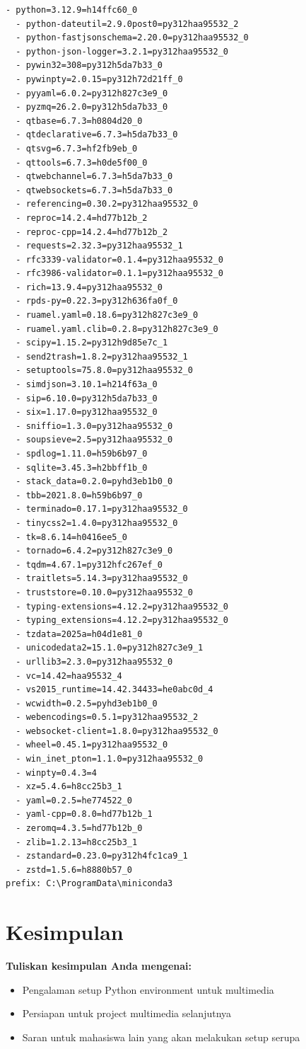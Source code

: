 \documentclass[11pt,a4paper]{article}
\begin{document}
\begin{lstlisting}[caption=Requirements file For Environment Reproduction]
  - python=3.12.9=h14ffc60_0
  - python-dateutil=2.9.0post0=py312haa95532_2
  - python-fastjsonschema=2.20.0=py312haa95532_0
  - python-json-logger=3.2.1=py312haa95532_0
  - pywin32=308=py312h5da7b33_0
  - pywinpty=2.0.15=py312h72d21ff_0
  - pyyaml=6.0.2=py312h827c3e9_0
  - pyzmq=26.2.0=py312h5da7b33_0
  - qtbase=6.7.3=h0804d20_0
  - qtdeclarative=6.7.3=h5da7b33_0
  - qtsvg=6.7.3=hf2fb9eb_0
  - qttools=6.7.3=h0de5f00_0
  - qtwebchannel=6.7.3=h5da7b33_0
  - qtwebsockets=6.7.3=h5da7b33_0
  - referencing=0.30.2=py312haa95532_0
  - reproc=14.2.4=hd77b12b_2
  - reproc-cpp=14.2.4=hd77b12b_2
  - requests=2.32.3=py312haa95532_1
  - rfc3339-validator=0.1.4=py312haa95532_0
  - rfc3986-validator=0.1.1=py312haa95532_0
  - rich=13.9.4=py312haa95532_0
  - rpds-py=0.22.3=py312h636fa0f_0
  - ruamel.yaml=0.18.6=py312h827c3e9_0
  - ruamel.yaml.clib=0.2.8=py312h827c3e9_0
  - scipy=1.15.2=py312h9d85e7c_1
  - send2trash=1.8.2=py312haa95532_1
  - setuptools=75.8.0=py312haa95532_0
  - simdjson=3.10.1=h214f63a_0
  - sip=6.10.0=py312h5da7b33_0
  - six=1.17.0=py312haa95532_0
  - sniffio=1.3.0=py312haa95532_0
  - soupsieve=2.5=py312haa95532_0
  - spdlog=1.11.0=h59b6b97_0
  - sqlite=3.45.3=h2bbff1b_0
  - stack_data=0.2.0=pyhd3eb1b0_0
  - tbb=2021.8.0=h59b6b97_0
  - terminado=0.17.1=py312haa95532_0
  - tinycss2=1.4.0=py312haa95532_0
  - tk=8.6.14=h0416ee5_0
  - tornado=6.4.2=py312h827c3e9_0
  - tqdm=4.67.1=py312hfc267ef_0
  - traitlets=5.14.3=py312haa95532_0
  - truststore=0.10.0=py312haa95532_0
  - typing-extensions=4.12.2=py312haa95532_0
  - typing_extensions=4.12.2=py312haa95532_0
  - tzdata=2025a=h04d1e81_0
  - unicodedata2=15.1.0=py312h827c3e9_1
  - urllib3=2.3.0=py312haa95532_0
  - vc=14.42=haa95532_4
  - vs2015_runtime=14.42.34433=he0abc0d_4
  - wcwidth=0.2.5=pyhd3eb1b0_0
  - webencodings=0.5.1=py312haa95532_2
  - websocket-client=1.8.0=py312haa95532_0
  - wheel=0.45.1=py312haa95532_0
  - win_inet_pton=1.1.0=py312haa95532_0
  - winpty=0.4.3=4
  - xz=5.4.6=h8cc25b3_1
  - yaml=0.2.5=he774522_0
  - yaml-cpp=0.8.0=hd77b12b_1
  - zeromq=4.3.5=hd77b12b_0
  - zlib=1.2.13=h8cc25b3_1
  - zstandard=0.23.0=py312h4fc1ca9_1
  - zstd=1.5.6=h8880b57_0
prefix: C:\ProgramData\miniconda3
\end{lstlisting}

\section{Kesimpulan}
\textbf{Tuliskan kesimpulan Anda mengenai:}
\begin{itemize}
    \item Pengalaman setup Python environment untuk multimedia
    \item Persiapan untuk project multimedia selanjutnya
    \item Saran untuk mahasiswa lain yang akan melakukan setup serupa
\end{itemize}
\end{document}
